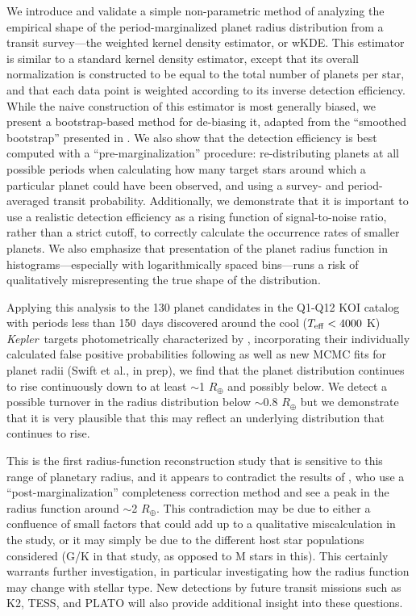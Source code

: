 \documentclass[iop]{emulateapj}
\def\Kepler{\textit{Kepler}}
\def\Rearth{R_\oplus}
\def\Pmax{150}
\begin{document}
We introduce and validate a simple non-parametric method of analyzing the empirical shape of the period-marginalized planet radius distribution from a transit survey---the weighted kernel density estimator, or wKDE.  This estimator is similar to a standard kernel density estimator, except that its overall normalization is constructed to be equal to the total number of planets per star, and that each data point is weighted according to its inverse detection efficiency.   While the naive construction of this estimator is most generally biased, we present a bootstrap-based method for de-biasing it, adapted from the ``smoothed bootstrap'' presented in \citet{narsky2013}.  We also show that the detection efficiency is best computed with a ``pre-marginalization'' procedure: re-distributing planets at all possible periods when calculating how many target stars around which a particular planet could have been observed, and using a survey- and period-averaged transit probability.  Additionally, we demonstrate that it is important to use a realistic detection efficiency as a rising function of signal-to-noise ratio, rather than a strict cutoff, to correctly calculate the occurrence rates of smaller planets.  We also emphasize that presentation of the planet radius function in histograms---especially with logarithmically spaced bins---runs a risk of qualitatively misrepresenting the true shape of the distribution.


 
Applying this analysis to the 130 planet candidates in the Q1-Q12 KOI catalog with periods less than \Pmax\ days discovered around the cool ($T_{\rm eff} < 4000$ K) \Kepler\ targets photometrically characterized by \citet{dressing2013}, incorporating their individually calculated false positive probabilities following \citet{morton2012} as well as new MCMC fits for planet radii (Swift et al., in prep), we find that the planet distribution continues to rise continuously down to at least $\sim$1 $\Rearth$ and possibly below.  We detect a possible turnover in the radius distribution below $\sim$0.8 $\Rearth$ but we demonstrate that it is very plausible that this may reflect an underlying distribution that continues to rise.  

This is the first radius-function reconstruction study that is sensitive to this range of planetary radius, and it appears to contradict the results of \citet{petigura2013b}, who use a ``post-marginalization'' completeness correction method and see a peak in the radius function around $\sim$2 $\Rearth$.  This contradiction may be due to either a confluence of small factors that could add up to a qualitative miscalculation in the \citet{petigura2013b} study, or it may simply be due to the different host star populations considered (G/K in that study, as opposed to M stars in this).  This certainly warrants further investigation, in particular investigating how the radius function may change with stellar type.  New detections by future transit missions such as K2, TESS, and PLATO will also provide additional insight into these questions.  
\end{document}
